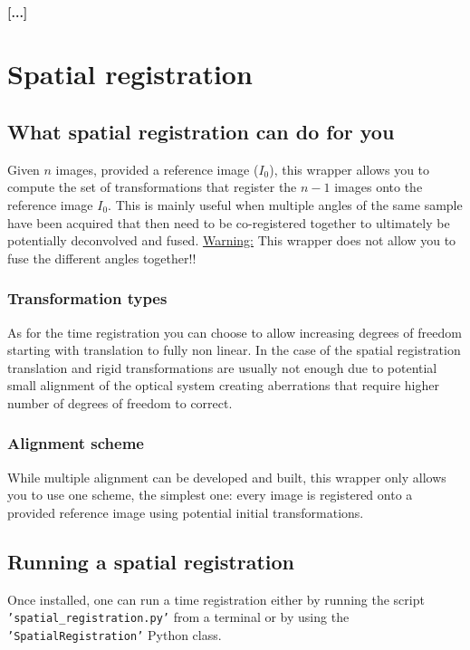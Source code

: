 \documentclass[10pt,a4paper]{book}
\newcommand{\option}[1]{{\texttt{'#1'}}}
\begin{document}
\subsubsection{[...]}
\chapter{Spatial registration}
\section{What spatial registration can do for you}
Given $n$ images, provided a reference image ($I_0$), this wrapper allows you to compute the set of transformations that register the $n-1$ images onto the reference image $I_0$. This is mainly useful when multiple angles of the same sample have been acquired that then need to be co-registered together to ultimately be potentially deconvolved and fused. \underline{Warning:} This wrapper does not allow you to fuse the different angles together!!
\subsection{Transformation types}
As for the time registration you can choose to allow increasing degrees of freedom starting with translation to fully non linear. In the case of the spatial registration translation and rigid transformations are usually not enough due to potential small alignment of the optical system creating aberrations that require higher number of degrees of freedom to correct.
\subsection{Alignment scheme}
While multiple alignment can be developed and built, this wrapper only allows you to use one scheme, the simplest one: every image is registered onto a provided reference image using potential initial transformations.
\section{Running a spatial registration}
Once installed, one can run a time registration either by running the script \option{spatial\_registration.py} from a terminal or by using the \option{SpatialRegistration} Python class.\\
\end{document}
